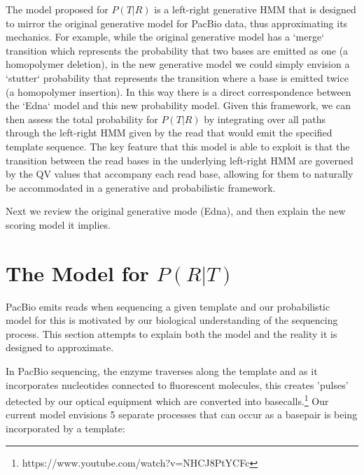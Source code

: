 \documentclass[fleqn,10pt]{SelfArx} %
\begin{document}
The model proposed for $P(T|R)$ is a left-right generative HMM that is designed to mirror the original generative model for PacBio data, thus approximating its mechanics.  For example, while the original generative model has a `merge` transition which represents the probability that two bases are emitted as one (a homopolymer deletion), in the new generative model we could simply envision a `stutter` probability that represents the transition where a base is emitted twice (a homopolymer insertion).  In this way there is a direct correspondence between the `Edna` model and this new probability model.  Given this framework, we can then assess the total probability for $P(T|R)$ by integrating over all paths through the left-right HMM given by the read that would emit the specified template sequence.  The key feature that this model is able to exploit is that the transition between the read bases in the underlying left-right HMM are governed by the QV values that accompany each read base, allowing for them to naturally be accommodated in a generative and probabilistic framework.  

Next we review the original generative mode (Edna), and then explain the new scoring model it implies.


\section{The Model for $P(R|T)$}

PacBio emits reads when sequencing a given template and our probabilistic model for this is motivated by our biological understanding of the sequencing process.  This section attempts to explain both the model and the reality it is designed to approximate.

In PacBio sequencing, the enzyme traverses along the template and as it incorporates nucleotides connected to fluorescent molecules, this creates 'pulses' detected by our optical equipment which are converted into basecalls.\footnote{https://www.youtube.com/watch?v=NHCJ8PtYCFc}  Our current model envisions 5 separate processes that can occur as a basepair is being incorporated by a template:
\end{document}
